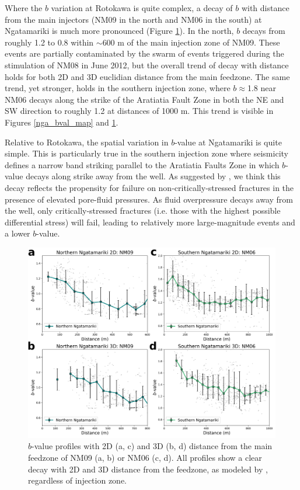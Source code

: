 Where the $b$ variation at Rotokawa is quite complex, a decay of $b$ with distance from the main injectors (NM09 in the north and NM06 in the south) at Ngatamariki is much more pronounced (Figure \ref{bval_prof}). In the north, $b$ decays from roughly 1.2 to 0.8 within $\sim$600 m of the main injection zone of NM09. These events are partially contaminated by the swarm of events triggered during the stimulation of NM08 in June 2012, but the overall trend of decay with distance holds for both 2D and 3D euclidian distance from the main feedzone. The same trend, yet stronger, holds in the southern injection zone, where $b\approx$1.8 near NM06 decays along the strike of the Aratiatia Fault Zone in both the NE and SW direction to roughly 1.2 at distances of 1000 m. This trend is visible in Figures \ref{nga_bval_map} and \ref{bval_prof}.

Relative to Rotokawa, the spatial variation in $b$-value at Ngatamariki is quite simple. This is particularly true in the southern injection zone where seismicity defines a narrow band striking parallel to the Aratiatia Faults Zone in which $b$-value decays along strike away from the well. As suggested by \citet{Bachmann_2012}, we think this decay reflects the propensity for failure on non-critically-stressed fractures in the presence of elevated pore-fluid pressures. As fluid overpressure decays away from the well, only critically-stressed fractures (i.e. those with the highest possible differential stress) will fail, leading to relatively more large-magnitude events and a lower $b$-value.

\begin{figure}[h!]
\begin{center}
\includegraphics[width=1.00\columnwidth]{Chapter_3_Nga/figures/Nga_bval_profiles/Nga_bvalues_2_3D_radius_plots_labels_3-18}
\caption[Ngatamariki $b$-value profiles]{{
$b$-value profiles with 2D (a, c) and 3D (b, d) distance from the main feedzone of NM09 (a, b) or NM06 (c, d). All profiles show a clear decay with 2D and 3D distance from the feedzone, as modeled by \citet{Bachmann_2012}, regardless of injection zone.
{\label{bval_prof}}%
}}
\end{center}
\end{figure}